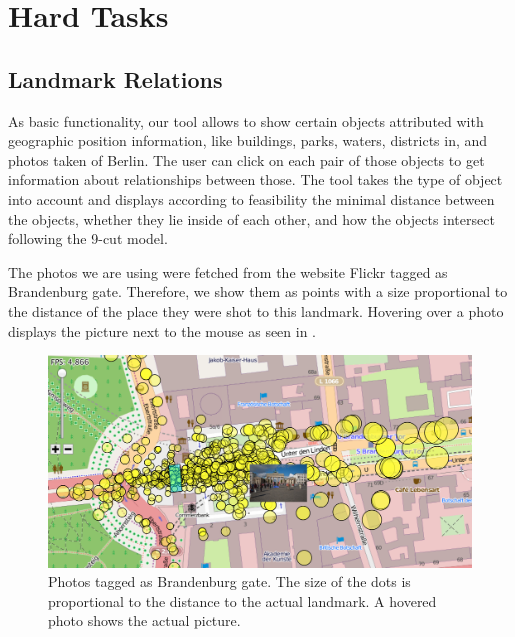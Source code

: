 \section*{Hard Tasks}

\subsection*{Landmark Relations}

As basic functionality, our tool allows to show certain objects attributed with
geographic position information, like buildings, parks, waters, districts in, and
photos taken of Berlin.
The user can click on each pair of those objects to get information about
relationships between those.
The tool takes the type of object into account and displays according
to feasibility the minimal distance between the objects, whether they lie
inside of each other, and how the objects intersect following the 9-cut model.

The photos we are using were fetched from the website Flickr tagged
as Brandenburg gate.
Therefore, we show them as points with a size proportional to
the distance of the place they were shot to this landmark.
Hovering over a photo displays the picture next to the mouse
as seen in .

\begin{figure}[b]
\centering
\includegraphics[width=0.9\linewidth]{imgs/brand}
\caption{Photos tagged as Brandenburg gate. The size of the dots
is proportional to the distance to the actual landmark.
A hovered photo shows the actual picture.}
\label{fig:brandenburg}
\end{figure}

